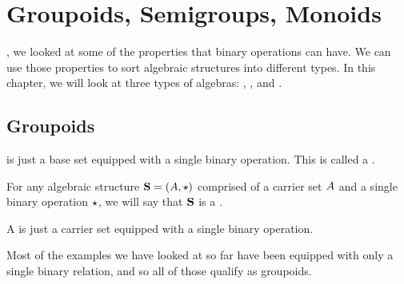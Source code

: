 \documentclass[../../../main.tex]{subfiles}
\begin{document}
\chapter{Groupoids, Semigroups, Monoids}
\label{ch:groupoids-semigroups-monoids}

, we looked at some of the properties that binary operations can have. We can use those properties to sort algebraic structures into different types. In this chapter, we will look at three types of algebras: , , and .


\section{Groupoids}

 is just a base set equipped with a single binary operation. This is called a .

\begin{fdefinition}[Groupoid]
  \label{def:groupoid}
  For any algebraic structure $\algebra{S} = (\set{A}, \opSymbol/)$ comprised of a carrier set $A$ and a single binary operation $\opSymbol/$, we will say that $\mathbf{S}$ is a .
\end{fdefinition}

\begin{terminology}
  A  is just a carrier set equipped with a single binary operation. 
\end{terminology}

Most of the examples we have looked at so far have been equipped with only a single binary relation, and so all of those qualify as groupoids.
\end{document}
